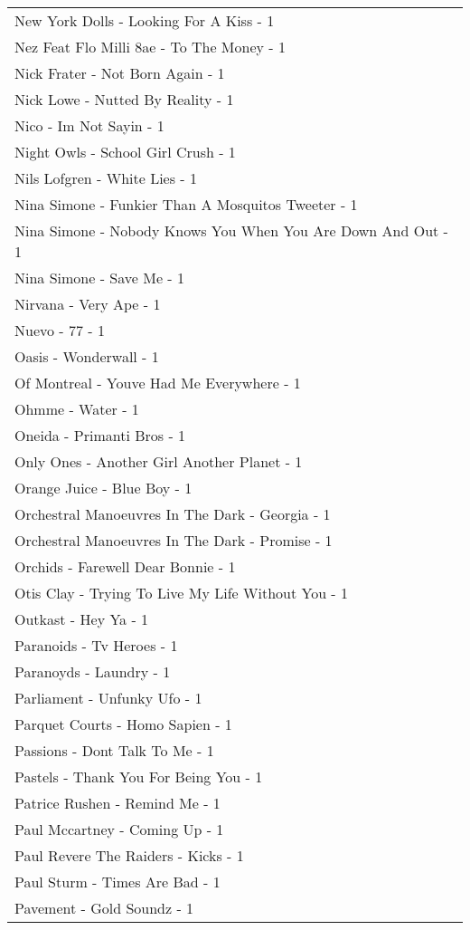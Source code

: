 \documentclass[
]{article}
\begin{document}
\begin{longtable}{l}
New York Dolls - Looking For A Kiss - 1 \\ 
Nez Feat Flo Milli 8ae - To The Money - 1 \\ 
Nick Frater - Not Born Again - 1 \\ 
Nick Lowe - Nutted By Reality - 1 \\ 
Nico - Im Not Sayin - 1 \\ 
Night Owls - School Girl Crush - 1 \\ 
Nils Lofgren - White Lies - 1 \\ 
Nina Simone - Funkier Than A Mosquitos Tweeter - 1 \\ 
Nina Simone - Nobody Knows You When You Are Down And Out - 1 \\ 
Nina Simone - Save Me - 1 \\ 
Nirvana - Very Ape - 1 \\ 
Nuevo - 77 - 1 \\ 
Oasis - Wonderwall - 1 \\ 
Of Montreal - Youve Had Me Everywhere - 1 \\ 
Ohmme - Water - 1 \\ 
Oneida - Primanti Bros - 1 \\ 
Only Ones - Another Girl Another Planet - 1 \\ 
Orange Juice - Blue Boy - 1 \\ 
Orchestral Manoeuvres In The Dark - Georgia - 1 \\ 
Orchestral Manoeuvres In The Dark - Promise - 1 \\ 
Orchids - Farewell Dear Bonnie - 1 \\ 
Otis Clay - Trying To Live My Life Without You - 1 \\ 
Outkast - Hey Ya - 1 \\ 
Paranoids - Tv Heroes - 1 \\ 
Paranoyds - Laundry - 1 \\ 
Parliament - Unfunky Ufo - 1 \\ 
Parquet Courts - Homo Sapien - 1 \\ 
Passions - Dont Talk To Me - 1 \\ 
Pastels - Thank You For Being You - 1 \\ 
Patrice Rushen - Remind Me - 1 \\ 
Paul Mccartney - Coming Up - 1 \\ 
Paul Revere The Raiders - Kicks - 1 \\ 
Paul Sturm - Times Are Bad - 1 \\ 
Pavement - Gold Soundz - 1 \\ 

\end{longtable}
\end{document}
